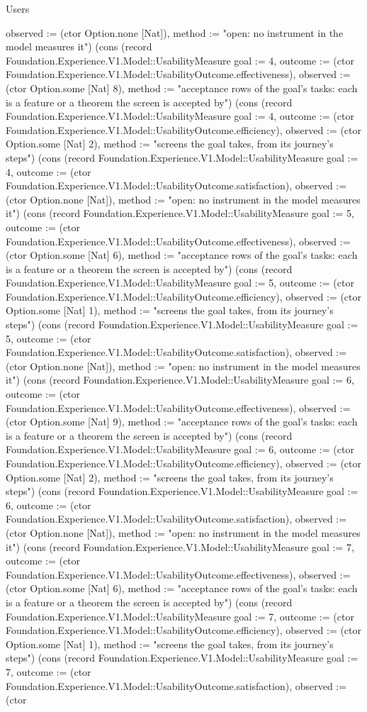 \begin{lexlean}{Users}
\begin{semanticmodule}
{observed := (ctor Option.none [Nat]), method := "open: no instrument in the model measures it"}) (cons (record Foundation.Experience.V1.Model::UsabilityMeasure {goal := 4, outcome := (ctor Foundation.Experience.V1.Model::UsabilityOutcome.effectiveness), observed := (ctor Option.some [Nat] 8), method := "acceptance rows of the goal's tasks: each is a feature or a theorem the screen is accepted by"}) (cons (record Foundation.Experience.V1.Model::UsabilityMeasure {goal := 4, outcome := (ctor Foundation.Experience.V1.Model::UsabilityOutcome.efficiency), observed := (ctor Option.some [Nat] 2), method := "screens the goal takes, from its journey's steps"}) (cons (record Foundation.Experience.V1.Model::UsabilityMeasure {goal := 4, outcome := (ctor Foundation.Experience.V1.Model::UsabilityOutcome.satisfaction), observed := (ctor Option.none [Nat]), method := "open: no instrument in the model measures it"}) (cons (record Foundation.Experience.V1.Model::UsabilityMeasure {goal := 5, outcome := (ctor Foundation.Experience.V1.Model::UsabilityOutcome.effectiveness), observed := (ctor Option.some [Nat] 6), method := "acceptance rows of the goal's tasks: each is a feature or a theorem the screen is accepted by"}) (cons (record Foundation.Experience.V1.Model::UsabilityMeasure {goal := 5, outcome := (ctor Foundation.Experience.V1.Model::UsabilityOutcome.efficiency), observed := (ctor Option.some [Nat] 1), method := "screens the goal takes, from its journey's steps"}) (cons (record Foundation.Experience.V1.Model::UsabilityMeasure {goal := 5, outcome := (ctor Foundation.Experience.V1.Model::UsabilityOutcome.satisfaction), observed := (ctor Option.none [Nat]), method := "open: no instrument in the model measures it"}) (cons (record Foundation.Experience.V1.Model::UsabilityMeasure {goal := 6, outcome := (ctor Foundation.Experience.V1.Model::UsabilityOutcome.effectiveness), observed := (ctor Option.some [Nat] 9), method := "acceptance rows of the goal's tasks: each is a feature or a theorem the screen is accepted by"}) (cons (record Foundation.Experience.V1.Model::UsabilityMeasure {goal := 6, outcome := (ctor Foundation.Experience.V1.Model::UsabilityOutcome.efficiency), observed := (ctor Option.some [Nat] 2), method := "screens the goal takes, from its journey's steps"}) (cons (record Foundation.Experience.V1.Model::UsabilityMeasure {goal := 6, outcome := (ctor Foundation.Experience.V1.Model::UsabilityOutcome.satisfaction), observed := (ctor Option.none [Nat]), method := "open: no instrument in the model measures it"}) (cons (record Foundation.Experience.V1.Model::UsabilityMeasure {goal := 7, outcome := (ctor Foundation.Experience.V1.Model::UsabilityOutcome.effectiveness), observed := (ctor Option.some [Nat] 6), method := "acceptance rows of the goal's tasks: each is a feature or a theorem the screen is accepted by"}) (cons (record Foundation.Experience.V1.Model::UsabilityMeasure {goal := 7, outcome := (ctor Foundation.Experience.V1.Model::UsabilityOutcome.efficiency), observed := (ctor Option.some [Nat] 1), method := "screens the goal takes, from its journey's steps"}) (cons (record Foundation.Experience.V1.Model::UsabilityMeasure {goal := 7, outcome := (ctor Foundation.Experience.V1.Model::UsabilityOutcome.satisfaction), observed := (ctor }
\end{semanticmodule}
\end{lexlean}
